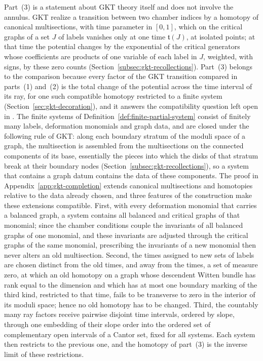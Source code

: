 Part~(3) is a statement about GKT theory itself and does not involve the
annulus.  GKT realize a transition between two chamber indices by a
homotopy of canonical multisections, with time parameter in $[0,1]$, which
on the critical graphs of a set $J$ of labels vanishes only at one time
$\mathfrak t(J)$, at isolated points; at that time the potential changes by
the exponential of the critical generators whose coefficients are products
of one variable of each label in $J$, weighted, with signs, by these zero
counts (Section~\ref{subsec:gkt-recollections}).  Part~(3) belongs to the
comparison because every factor of the GKT transition compared in
parts~(1) and~(2) is the total change of the potential across the time
interval of its ray, for one such compatible homotopy restricted to a finite
system (Section~\ref{sec:gkt-decoration}), and it answers the compatibility
question left open in \cite{wuebben2026boundary}.  The finite systems of
Definition~\ref{def:finite-partial-system} consist of finitely many labels,
deformation monomials and graph data, and are closed under the following
rule of GKT: along each boundary stratum of the moduli space of a graph, the
multisection is assembled from the multisections on the connected
components of its base, essentially the pieces into which the disks of that
stratum break at their boundary nodes (Section~\ref{subsec:gkt-recollections}),
so a system that contains a graph datum contains the data of these
components.  The proof in
Appendix~\ref{app:gkt-completion} extends canonical multisections and
homotopies relative to the data already chosen, and three features of the
construction make these extensions compatible.  First, with every
deformation monomial that carries a balanced graph, a system contains all
balanced and critical graphs of that monomial; since the chamber conditions
couple the invariants of all balanced graphs of one monomial, and these
invariants are adjusted through the critical graphs of the same monomial,
prescribing the invariants of a new monomial then never alters an old
multisection.
Second, the times assigned to new sets of labels are chosen distinct from
the old times, and away from the times, a set of measure zero, at which an
old homotopy on a graph whose descendent Witten bundle has rank equal to the
dimension and which has at most one boundary marking of the third kind,
restricted to that time, fails to be transverse to zero in the interior of
its moduli space; hence no old homotopy has to be changed.  Third,
the countably many ray factors receive pairwise disjoint time intervals,
ordered by slope, through one embedding of their slope order into the
ordered set of complementary open intervals of a Cantor set, fixed for all
systems.  Each system then restricts to the previous one, and the homotopy
of part~(3) is the inverse limit of these restrictions.

